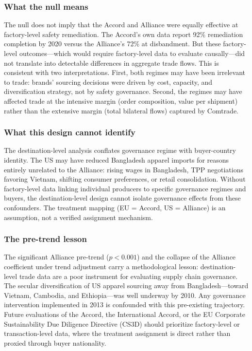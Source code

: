 \documentclass[12pt]{article}
\begin{document}
\subsubsection*{What the null means} The null does not imply that the Accord and Alliance were equally effective at factory-level safety remediation. The Accord's own data report 92\% remediation completion by 2020 versus the Alliance's 72\% at disbandment. But these factory-level outcomes---which would require factory-level data to evaluate causally---did not translate into detectable differences in aggregate trade flows. This is consistent with two interpretations. First, both regimes may have been irrelevant to trade: brands' sourcing decisions were driven by cost, capacity, and diversification strategy, not by safety governance. Second, the regimes may have affected trade at the intensive margin (order composition, value per shipment) rather than the extensive margin (total bilateral flows) captured by Comtrade.

\subsubsection*{What this design cannot identify} The destination-level analysis conflates governance regime with buyer-country identity. The US may have reduced Bangladesh apparel imports for reasons entirely unrelated to the Alliance: rising wages in Bangladesh, TPP negotiations favoring Vietnam, shifting consumer preferences, or retail consolidation. Without factory-level data linking individual producers to specific governance regimes and buyers, the destination-level design cannot isolate governance effects from these confounders. The treatment mapping (EU = Accord, US = Alliance) is an assumption, not a verified assignment mechanism.

\subsubsection*{The pre-trend lesson} The significant Alliance pre-trend ($p < 0.001$) and the collapse of the Alliance coefficient under trend adjustment carry a methodological lesson: destination-level trade data are a poor instrument for evaluating supply chain governance. The secular diversification of US apparel sourcing away from Bangladesh---toward Vietnam, Cambodia, and Ethiopia---was well underway by 2010. Any governance intervention implemented in 2013 is confounded with this pre-existing trajectory. Future evaluations of the Accord, the International Accord, or the EU Corporate Sustainability Due Diligence Directive (CS3D) should prioritize factory-level or transaction-level data, where the treatment assignment is direct rather than proxied through buyer nationality.
\end{document}
